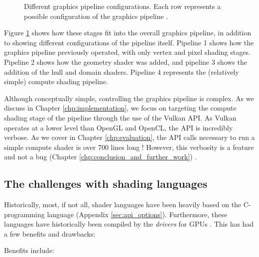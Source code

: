\documentclass[a4paper,12pt,twoside,openright]{report}
\begin{document}
\begin{figure}[h]
\centering
\def\svgwidth{\linewidth}

\caption{Different graphics pipeline configurations. Each row represents a
possible configuration of the graphics pipeline
\cite{TripThroughGraphicsPipeline3}.}
\label{fig:graphics_pipeline_stages}
\end{figure}

Figure \ref{fig:graphics_pipeline_stages} shows how these stages fit into the
overall graphics pipeline, in addition to showing different configurations of
the pipeline itself. Pipeline 1 shows how the graphics pipeline previously
operated, with only vertex and pixel shading stages. Pipeline 2 shows how the
geometry shader was added, and pipeline 3 shows the addition of the hull and
domain shaders. Pipeline 4 represents the (relatively simple) compute shading
pipeline.

Although conceptually simple, controlling the graphics pipeline is complex. As
we discuss in Chapter \ref{chp:implementation}, we focus on targeting the
compute shading stage of the pipeline through the use of the Vulkan API. As
Vulkan operates at a lower level than OpenGL and OpenCL, the API is incredibly
verbose. As we cover in Chapter \ref{chp:evaluation}, the API calls necessary
to run a simple compute shader is over 700 lines long \cite{ProjectSource}!
However, this verbosity is a feature and not a bug (Chapter
\ref{chp:conclusion_and_further_work}) \cite{VulkanAnnouncement}.

\subsection{The challenges with shading languages}

\label{sec:shading_langauge_challenges}

Historically, most, if not all, shader languages have been heavily based on the
C-programming language (Appendix \ref{sec:api_options}). Furthermore, these
languages have historically been compiled by the \textit{drivers} for GPUs
\cite{TripThroughGraphicsPipeline1}. This has had a few benefits and drawbacks:

Benefits include:
\end{document}
